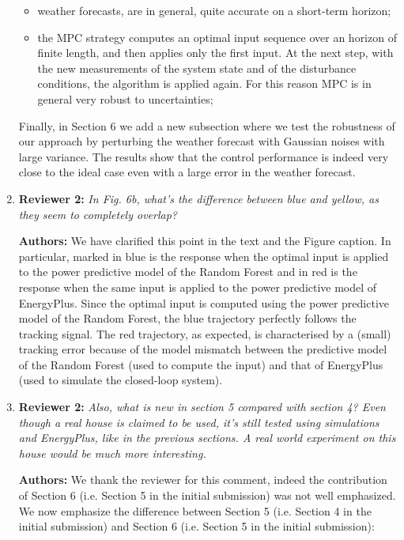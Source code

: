 \documentclass{article}
\begin{document}
\begin{enumerate}
	\begin{itemize}

	\item weather forecasts, are in general, quite accurate on a short-term horizon;

	\item the MPC strategy computes an optimal input sequence over an horizon of finite length, and then applies only the first input. At the next step, with the new measurements of the system state and of the disturbance conditions, the algorithm is applied again. For this reason MPC is in general very robust to uncertainties;

	\end{itemize}
	Finally, in Section 6 we add a new subsection where we test the robustness of our approach by perturbing the weather forecast with Gaussian noises with large variance. The results show that the control performance is indeed very close to the ideal case even with a large error in the weather forecast.



\item \textbf{Reviewer 2:} \textit{In Fig. 6b, what's the difference between blue and yellow, as they seem to completely overlap?}



\textbf{Authors:} We have clarified this point in the text and the Figure caption. In particular, marked in blue is the response when the optimal input is applied to the power predictive model of the Random Forest and in red is the response when the same input is applied to the power predictive model of EnergyPlus. Since the optimal input is computed using the power predictive model of the Random Forest, the blue trajectory perfectly follows the tracking signal. The red trajectory, as expected, is characterised by a (small) tracking error because of the model mismatch between the predictive model of the Random Forest (used to compute the input) and that of EnergyPlus (used to simulate the closed-loop system).



\item \textbf{Reviewer 2:} \textit{Also, what is new in section 5 compared with section 4? Even though a real house is claimed to be used, it's still tested using simulations and EnergyPlus, like in the previous sections. A real world experiment on this house would be much more interesting.}



\textbf{Authors:} We thank the reviewer for this comment, indeed the contribution of Section 6 (i.e. Section 5 in the initial submission) was not well emphasized. We now emphasize the difference between Section 5 (i.e. Section 4 in the initial submission) and Section 6 (i.e. Section 5 in the initial submission):
\begin{itemize}


\end{itemize}
\end{enumerate}
\end{document}
